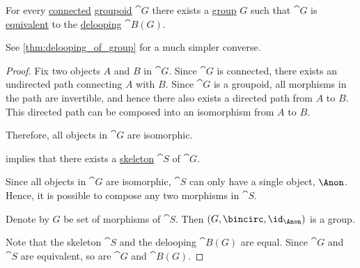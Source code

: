 \begin{proposition}\label{thm:connected_delooping}
  For every \hyperref[def:connected_category]{connected} \hyperref[def:groupoid]{groupoid} \( \cat{G} \) there exists a \hyperref[def:group]{group} \( G \) such that \( \cat{G} \) is \hyperref[def:equivalence_of_categories]{equivalent} to the \hyperref[def:monoid_delooping]{delooping} \( \cat{B}(G) \).
\end{proposition}
\begin{comments}
  \item See \cref{thm:delooping_of_group} for a much simpler converse.
\end{comments}
\begin{proof}
   Fix two objects \( A \) and \( B \) in \( \cat{G} \). Since \( \cat{G} \) is connected, there exists an undirected path connecting \( A \) with \( B \). Since \( \cat{G} \) is a groupoid, all morphisms in the path are invertible, and hence there also exists a directed path from \( A \) to \( B \). This directed path can be composed into an isomorphism from \( A \) to \( B \).

  Therefore, all objects in \( \cat{G} \) are isomorphic.

    implies that there exists a \hyperref[def:skeletal_category]{skeleton} \( \cat{S} \) of \( \cat{G} \).

  Since all objects in \( \cat{G} \) are isomorphic, \( \cat{S} \) can only have a single object, \( \Anon \). Hence, it is possible to compose any two morphisms in \( \cat{S} \).

  Denote by \( G \) be set of morphisms of \( \cat{S} \). Then \( (G, {\bincirc}, \id_{\Anon}) \) is a group.

   Note that the skeleton \( \cat{S} \) and the delooping \( \cat{B}(G) \) are equal. Since \( \cat{G} \) and \( \cat{S} \) are equivalent, so are \( \cat{G} \) and \( \cat{B}(G) \).
\end{proof}
